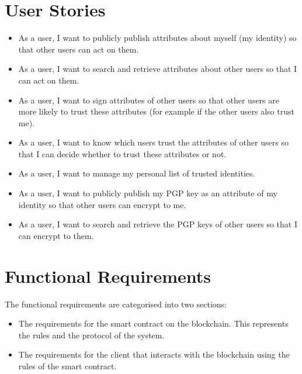 \documentclass[12pt]{report}
\begin{document}
	\section{User Stories}
	\begin{itemize}
		\item As a user, I want to publicly publish attributes about myself (my identity) so that other users can act on them.
		\item As a user, I want to search and retrieve attributes about other users so that I can act on them.
		\item As a user, I want to sign attributes of other users so that other users are more likely to trust these attributes (for example if the other users also trust me).
		\item As a user, I want to know which users trust the attributes of other users so that I can decide whether to trust these attributes or not.
		\item As a user, I want to manage my personal list of trusted identities.
		\item As a user, I want to publicly publish my PGP key as an attribute of my identity so that other users can encrypt to me.
		\item As a user, I want to search and retrieve the PGP keys of other users so that I can encrypt to them.
	\end{itemize}
	
	\section{Functional Requirements}
	The functional requirements are categorised into two sections:
	\begin{itemize}
		\item The requirements for the smart contract on the blockchain. This represents the rules and the protocol of the system.
		\item The requirements for the client that interacts with the blockchain using the rules of the smart contract.
	\end{itemize}		
	
\end{document}
